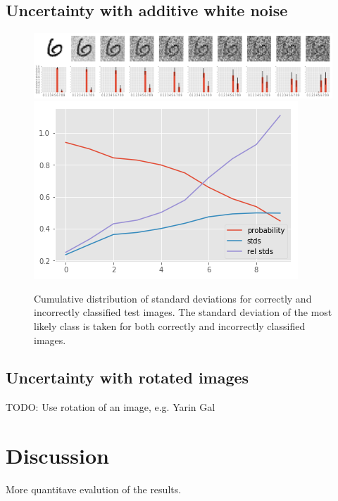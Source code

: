 \documentclass{article}
\begin{document}
\subsection{Uncertainty with additive white noise}
\begin{figure}[h]
	\centering
	\includegraphics[width=1.0\textwidth]{awgn_predictions}
	\includegraphics[scale=0.4]{awgn_predictions_stds}
	\caption{Cumulative distribution of standard deviations for correctly and incorrectly classified test images. The standard deviation of the most likely class is taken for both correctly and incorrectly classified images.}
	\label{fig/awgn_predictions}
\end{figure}

\subsection{Uncertainty with rotated images}
TODO: Use rotation of an image, e.g. Yarin Gal


\section{Discussion}
More quantitave evalution of the results.
\end{document}
